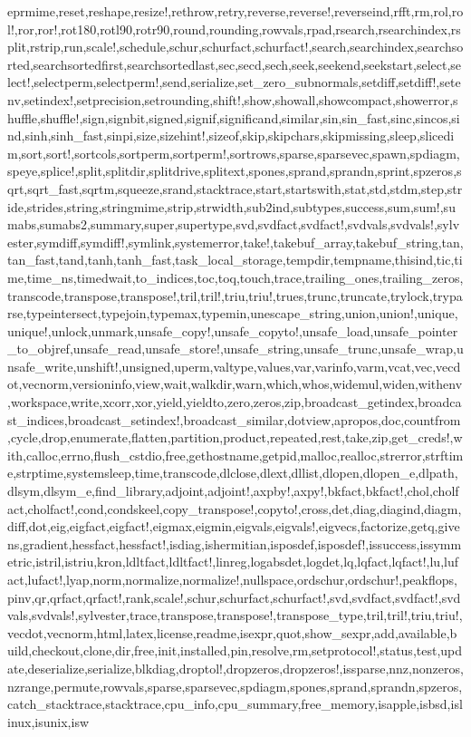 {eprmime,reset,reshape,resize!,rethrow,retry,reverse,reverse!,reverseind,rfft,rm,rol,rol!,ror,ror!,rot180,rotl90,rotr90,round,rounding,rowvals,rpad,rsearch,rsearchindex,rsplit,rstrip,run,scale!,schedule,schur,schurfact,schurfact!,search,searchindex,searchsorted,searchsortedfirst,searchsortedlast,sec,secd,sech,seek,seekend,seekstart,select,select!,selectperm,selectperm!,send,serialize,set_zero_subnormals,setdiff,setdiff!,setenv,setindex!,setprecision,setrounding,shift!,show,showall,showcompact,showerror,shuffle,shuffle!,sign,signbit,signed,signif,significand,similar,sin,sin_fast,sinc,sincos,sind,sinh,sinh_fast,sinpi,size,sizehint!,sizeof,skip,skipchars,skipmissing,sleep,slicedim,sort,sort!,sortcols,sortperm,sortperm!,sortrows,sparse,sparsevec,spawn,spdiagm,speye,splice!,split,splitdir,splitdrive,splitext,spones,sprand,sprandn,sprint,spzeros,sqrt,sqrt_fast,sqrtm,squeeze,srand,stacktrace,start,startswith,stat,std,stdm,step,stride,strides,string,stringmime,strip,strwidth,sub2ind,subtypes,success,sum,sum!,sumabs,sumabs2,summary,super,supertype,svd,svdfact,svdfact!,svdvals,svdvals!,sylvester,symdiff,symdiff!,symlink,systemerror,take!,takebuf_array,takebuf_string,tan,tan_fast,tand,tanh,tanh_fast,task_local_storage,tempdir,tempname,thisind,tic,time,time_ns,timedwait,to_indices,toc,toq,touch,trace,trailing_ones,trailing_zeros,transcode,transpose,transpose!,tril,tril!,triu,triu!,trues,trunc,truncate,trylock,tryparse,typeintersect,typejoin,typemax,typemin,unescape_string,union,union!,unique,unique!,unlock,unmark,unsafe_copy!,unsafe_copyto!,unsafe_load,unsafe_pointer_to_objref,unsafe_read,unsafe_store!,unsafe_string,unsafe_trunc,unsafe_wrap,unsafe_write,unshift!,unsigned,uperm,valtype,values,var,varinfo,varm,vcat,vec,vecdot,vecnorm,versioninfo,view,wait,walkdir,warn,which,whos,widemul,widen,withenv,workspace,write,xcorr,xor,yield,yieldto,zero,zeros,zip,broadcast_getindex,broadcast_indices,broadcast_setindex!,broadcast_similar,dotview,apropos,doc,countfrom,cycle,drop,enumerate,flatten,partition,product,repeated,rest,take,zip,get_creds!,with,calloc,errno,flush_cstdio,free,gethostname,getpid,malloc,realloc,strerror,strftime,strptime,systemsleep,time,transcode,dlclose,dlext,dllist,dlopen,dlopen_e,dlpath,dlsym,dlsym_e,find_library,adjoint,adjoint!,axpby!,axpy!,bkfact,bkfact!,chol,cholfact,cholfact!,cond,condskeel,copy_transpose!,copyto!,cross,det,diag,diagind,diagm,diff,dot,eig,eigfact,eigfact!,eigmax,eigmin,eigvals,eigvals!,eigvecs,factorize,getq,givens,gradient,hessfact,hessfact!,isdiag,ishermitian,isposdef,isposdef!,issuccess,issymmetric,istril,istriu,kron,ldltfact,ldltfact!,linreg,logabsdet,logdet,lq,lqfact,lqfact!,lu,lufact,lufact!,lyap,norm,normalize,normalize!,nullspace,ordschur,ordschur!,peakflops,pinv,qr,qrfact,qrfact!,rank,scale!,schur,schurfact,schurfact!,svd,svdfact,svdfact!,svdvals,svdvals!,sylvester,trace,transpose,transpose!,transpose_type,tril,tril!,triu,triu!,vecdot,vecnorm,html,latex,license,readme,isexpr,quot,show_sexpr,add,available,build,checkout,clone,dir,free,init,installed,pin,resolve,rm,setprotocol!,status,test,update,deserialize,serialize,blkdiag,droptol!,dropzeros,dropzeros!,issparse,nnz,nonzeros,nzrange,permute,rowvals,sparse,sparsevec,spdiagm,spones,sprand,sprandn,spzeros,catch_stacktrace,stacktrace,cpu_info,cpu_summary,free_memory,isapple,isbsd,islinux,isunix,isw}
